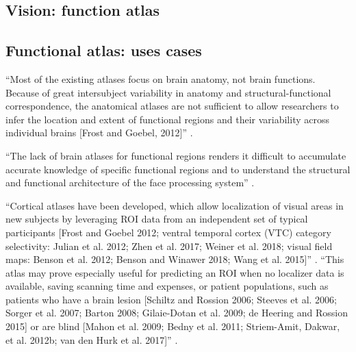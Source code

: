 \subsection{Vision: function atlas}




\subsection{Functional atlas: uses cases}


``Most of the existing atlases focus on brain anatomy, not brain functions.
%
Because of great intersubject variability in anatomy and structural-functional
correspondence, the anatomical atlases are not sufficient to allow researchers
to infer the location and extent of functional regions and their variability
across individual brains [Frost and Goebel, 2012]'' \citep{zhen2015quantifying}.

``The lack of brain atlases for functional regions renders it difficult to
accumulate accurate knowledge of specific functional regions and to understand
the structural and functional architecture of the face processing system''
\citep{zhen2015quantifying}.


``Cortical atlases have been developed, which allow localization of visual areas
in new subjects by leveraging ROI data from an independent set of typical
participants [Frost and Goebel 2012; ventral temporal cortex (VTC) category
selectivity: Julian et al. 2012; Zhen et al.  2017; Weiner et al. 2018; visual
field maps: Benson et al. 2012; Benson and Winawer 2018; Wang et al. 2015]''
\citep{rosenke2021probabilistic}.
%
``This atlas may prove especially useful for predicting an ROI when no localizer
data is available, saving scanning time and expenses, or
%
patient populations, such as patients who have a brain lesion [Schiltz and
Rossion 2006; Steeves et al. 2006; Sorger et al. 2007; Barton 2008; Gilaie-Dotan
et al. 2009; de Heering and Rossion 2015] or are blind [Mahon et al. 2009; Bedny
et al. 2011; Striem-Amit, Dakwar, et al.  2012b; van den Hurk et al. 2017]''
\citep{rosenke2021probabilistic}.

